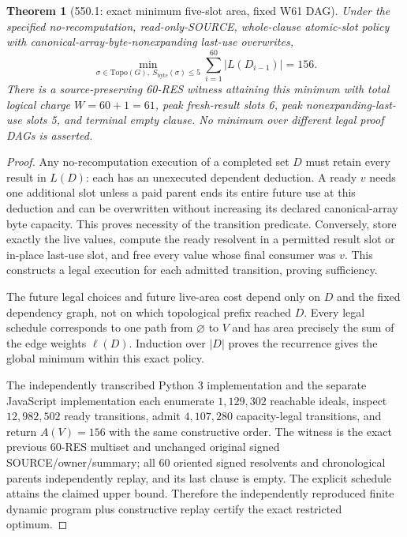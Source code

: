 \documentclass[11pt]{article}
\newtheorem{theorem}{Theorem}
\begin{document}
\begin{theorem}[550.1: exact minimum five-slot area, fixed W61 DAG]
Under the specified no-recomputation, read-only-SOURCE, whole-clause atomic-slot policy with canonical-array-byte-nonexpanding last-use overwrites,
\[
\boxed{\min_{\sigma\in\mathrm{Topo}(G),\ S_{\mathrm{byte}}(\sigma)\leq5}
\sum_{i=1}^{60}|L(D_{i-1})|=156.}
\]
There is a source-preserving 60-RES witness attaining this minimum with total logical charge $W=60+1=61$, peak fresh-result slots 6, peak nonexpanding-last-use slots 5, and terminal empty clause. No minimum over \emph{different} legal proof DAGs is asserted.
\end{theorem}
\begin{proof}
Any no-recomputation execution of a completed set $D$ must retain every result in $L(D)$: each has an unexecuted dependent deduction. A ready $v$ needs one additional slot unless a paid parent ends its entire future use at this deduction and can be overwritten without increasing its declared canonical-array byte capacity. This proves necessity of the transition predicate. Conversely, store exactly the live values, compute the ready resolvent in a permitted result slot or in-place last-use slot, and free every value whose final consumer was $v$. This constructs a legal execution for each admitted transition, proving sufficiency.

The future legal choices and future live-area cost depend only on $D$ and the fixed dependency graph, not on which topological prefix reached $D$. Every legal schedule corresponds to one path from $\varnothing$ to $V$ and has area precisely the sum of the edge weights $\ell(D)$. Induction over $|D|$ proves the recurrence gives the global minimum within this exact policy.

The independently transcribed Python 3 implementation and the separate JavaScript implementation each enumerate $1{,}129{,}302$ reachable ideals, inspect $12{,}982{,}502$ ready transitions, admit $4{,}107{,}280$ capacity-legal transitions, and return $A(V)=156$ with the same constructive order. The witness is the exact previous 60-RES multiset and unchanged original signed SOURCE/owner/summary; all 60 oriented signed resolvents and chronological parents independently replay, and its last clause is empty. The explicit schedule attains the claimed upper bound. Therefore the independently reproduced finite dynamic program plus constructive replay certify the exact restricted optimum. \qedhere
\end{proof}
\end{document}
